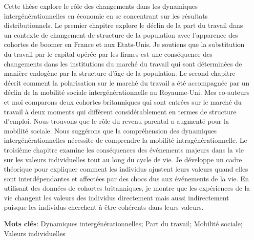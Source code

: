 Cette thèse explore le rôle des changements dans les dynamiques intergénérationnelles en économie en se concentrant sur les résultats distributionnels. 
Le premier chapitre explore le déclin de la part du travail dans un contexte de changement de structure de la population avec l’apparence des cohortes de boomer en France et aux Etats-Unis. Je soutiens que la substitution du travail par le capital opérée par les firmes est une conséquence des changements dans les institutions du marché du travail qui sont déterminées de manière endogène par la structure d’âge de la population. 
Le second chapitre décrit comment la polarisation sur le marché du travail a été accompagnée par un déclin de la mobilité sociale intergénérationnelle au Royaume-Uni. Mes co-auteurs et moi comparons deux cohortes britanniques qui sont entrées sur le marché du travail à deux moments qui diffèrent considérablement en termes de structure d’emploi. Nous trouvons que le rôle du revenu parental a augmenté pour la mobilité sociale. Nous suggérons que la compréhension des dynamiques intergénérationnelles nécessite de comprendre la mobilité intragénérationnelle. 
Le troisième chapitre examine les conséquences des événements majeurs dans la vie sur les valeurs individuelles tout au long du cycle de vie. Je développe un cadre théorique pour expliquer comment les individus ajustent leurs valeurs quand elles sont interdépendantes et affectées par des chocs dus aux événements de la vie. En utilisant des données de cohortes britanniques, je montre que les expériences de la vie changent les valeurs des individus directement mais aussi indirectement puisque les individus cherchent à être cohérents dans leurs valeurs.

\vspace{0.5cm}
\noindent\textbf{Mots clés}: Dynamiques intergénérationnelles; Part du travail; Mobilité sociale; Valeurs individuelles\\

